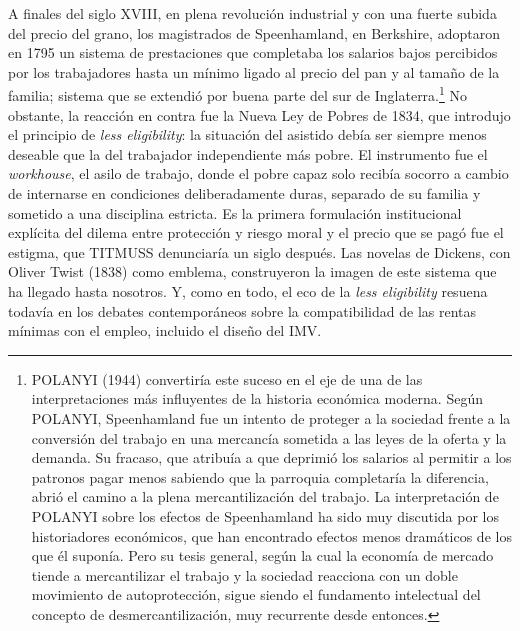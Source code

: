 \documentclass[10pt,a4paper]{article}
\begin{document}
A finales del siglo XVIII, en plena revolución industrial y con una fuerte subida del precio del grano, los magistrados de Speenhamland, en Berkshire, adoptaron en 1795 un sistema de prestaciones que completaba los salarios bajos percibidos por los trabajadores hasta un mínimo ligado al precio del pan y al tamaño de la familia; sistema que se extendió por buena parte del sur de Inglaterra.\footnote{POLANYI (1944) convertiría este suceso en el eje de una de las interpretaciones más influyentes de la historia económica moderna. Según POLANYI, Speenhamland fue un intento de proteger a la sociedad frente a la conversión del trabajo en una mercancía sometida a las leyes de la oferta y la demanda. Su fracaso, que atribuía a que deprimió los salarios al permitir a los patronos pagar menos sabiendo que la parroquia completaría la diferencia, abrió el camino a la plena mercantilización del trabajo. La interpretación de POLANYI sobre los efectos de Speenhamland ha sido muy discutida por los historiadores económicos, que han encontrado efectos menos dramáticos de los que él suponía. Pero su tesis general, según la cual la economía de mercado tiende a mercantilizar el trabajo y la sociedad reacciona con un doble movimiento de autoprotección, sigue siendo el fundamento intelectual del concepto de desmercantilización, muy recurrente desde entonces.
} No obstante, la reacción en contra fue la Nueva Ley de Pobres de 1834, que introdujo el principio de \textit{less eligibility}: la situación del asistido debía ser siempre menos deseable que la del trabajador independiente más pobre. El instrumento fue el \textit{workhouse}, el asilo de trabajo, donde el pobre capaz solo recibía socorro a cambio de internarse en condiciones deliberadamente duras, separado de su familia y sometido a una disciplina estricta. Es la primera formulación institucional explícita del dilema entre protección y riesgo moral y el precio que se pagó fue el estigma, que TITMUSS denunciaría un siglo después. Las novelas de Dickens, con Oliver Twist (1838) como emblema, construyeron la imagen de este sistema que ha llegado hasta nosotros. Y, como en todo, el eco de la \textit{less eligibility} resuena todavía en los debates contemporáneos sobre la compatibilidad de las rentas mínimas con el empleo, incluido el diseño del IMV.
\end{document}
